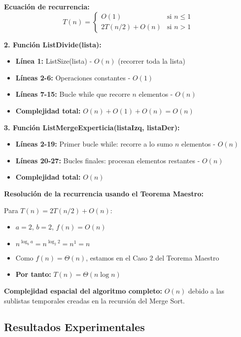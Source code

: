 \documentclass[11pt,a4paper]{article}
\begin{document}
\textbf{Ecuación de recurrencia:}
$$T(n) = \begin{cases}
O(1) & \text{si } n \leq 1 \\
2T(n/2) + O(n) & \text{si } n > 1
\end{cases}$$

\textbf{2. Función ListDivide(lista):}
\begin{itemize}[label=\textbullet]
\item \textbf{Línea 1:} ListSize(lista) - $O(n)$ (recorrer toda la lista)
\item \textbf{Líneas 2-6:} Operaciones constantes - $O(1)$
\item \textbf{Líneas 7-15:} Bucle while que recorre $n$ elementos - $O(n)$
\item \textbf{Complejidad total:} $O(n) + O(1) + O(n) = O(n)$
\end{itemize}

\textbf{3. Función ListMergeExperticia(listaIzq, listaDer):}
\begin{itemize}[label=\textbullet]
\item \textbf{Líneas 2-19:} Primer bucle while: recorre a lo sumo $n$ elementos - $O(n)$
\item \textbf{Líneas 20-27:} Bucles finales: procesan elementos restantes - $O(n)$
\item \textbf{Complejidad total:} $O(n)$
\end{itemize}

\textbf{Resolución de la recurrencia usando el Teorema Maestro:}

Para $T(n) = 2T(n/2) + O(n)$:
\begin{itemize}[label=\textbullet]
\item $a = 2$, $b = 2$, $f(n) = O(n)$
\item $n^{\log_b a} = n^{\log_2 2} = n^1 = n$
\item Como $f(n) = \Theta(n)$, estamos en el Caso 2 del Teorema Maestro
\item \textbf{Por tanto:} $T(n) = \Theta(n \log n)$
\end{itemize}

\textbf{Complejidad espacial del algoritmo completo:} $O(n)$ debido a las sublistas temporales creadas en la recursión del Merge Sort.

\subsection{Resultados Experimentales}
\end{document}
